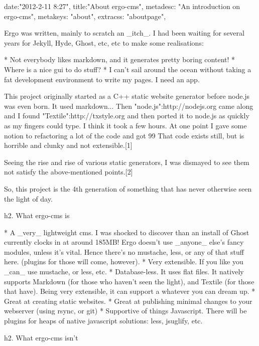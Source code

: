 {
date:"2012-2-11 8:27",
title:"About ergo-cms",
metadesc: "An introduction on ergo-cms",
metakeys: "about",
extracss: "aboutpage",
}

Ergo was written, mainly to scratch an _itch_. I had been waiting for several years for Jekyll, Hyde, Ghost, etc, etc to make some realisations:

* Not everybody likes markdown, and it generates pretty boring content!
* Where is a nice gui to do stuff?
* I can't sail around the ocean without taking a fat development environment to write my pages. I need an app.

This project originally started as a C++ static website generator before node.js was even born. It used markdown... 
Then "node.js":http://nodejs.org came along and I found "Textile":http://txstyle.org and then ported it to node.js as quickly as my fingers could type. I think it took a few hours. 
At one point I gave some notion to refactoring a lot of the code and got 99%
That code exists still, but is horrible and clunky and not extensible.[1]

Seeing the rise and rise of various static generators, I was dismayed to see them not satisfy the above-mentioned points.[2]

So, this project is the 4th generation of something that has never otherwise seen the light of day.


h2. What ergo-cms is

* A _very_ lightweight cms. I was shocked to discover than an install of Ghost currently clocks in at around 185MB! Ergo doesn't use _anyone_ else's fancy modules, unless it's vital. Hence there's no mustache, less, or any of that stuff here. (plugins for those will come, however).
* Very extensible. If you like you _can_ use mustache, or less, etc.
* Database-less. It uses flat files. It natively supports Markdown (for those who haven't seen the light), and Textile (for those that have). Being very extensible, it can support a whatever you can dream up.
* Great at creating static websites. 
* Great at publishing minimal changes to your webserver (using rsync, or git)
* Supportive of things Javascript. There will be plugins for heaps of native javascript solutions: less, jsuglify, etc.

h2. What ergo-cms isn't

